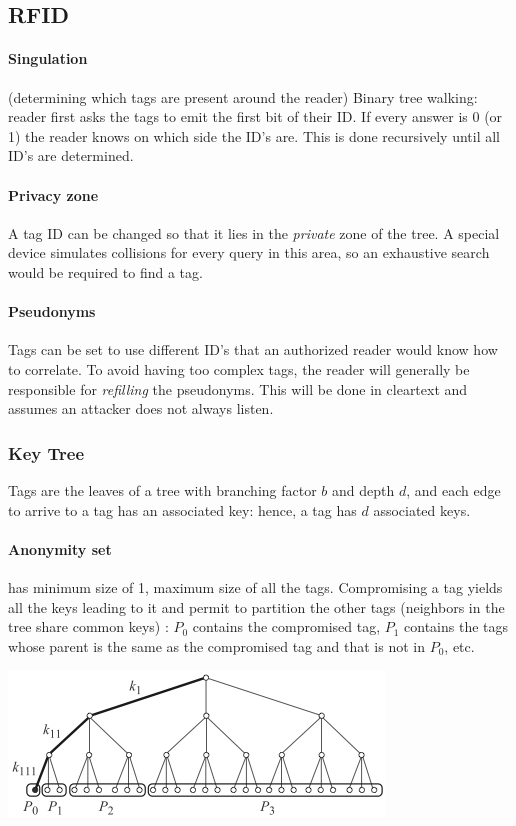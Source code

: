 \documentclass[10pt, a4paper,twocolumn]{scrartcl}
\begin{document}
\subsection{RFID}
\paragraph{Singulation} (determining which tags are present around the reader) Binary tree walking: reader first asks the tags to emit the first bit of their ID. If every answer is 0 (or 1) the reader knows on which side the ID's are. This is done recursively until all ID's are determined.

\paragraph{Privacy zone} A tag ID can be changed so that it lies in the \emph{private} zone of the tree. A special device simulates collisions for every query in this area, so an exhaustive search would be required to find a tag. 

\paragraph{Pseudonyms} Tags can be set to use different ID's that an authorized reader would know how to correlate. To avoid having too complex tags, the reader will generally be responsible for \emph{refilling} the pseudonyms. This will be done in cleartext and assumes an attacker does not always listen.

\subsubsection{Key Tree}
Tags are the leaves of a tree with branching factor $b$ and depth $d$, and each edge to arrive to a tag has an associated key: hence, a tag has $d$ associated keys.

\paragraph{Anonymity set} has minimum size of 1, maximum size of all the tags. Compromising a tag yields all the keys leading to it and permit to partition the other tags (neighbors in the tree share common keys) : $P_0$ contains the compromised tag, $P_1$ contains the tags whose parent is the same as the compromised tag and that is not in $P_0$, etc.
\begin{center}
\includegraphics[width=0.7\columnwidth]{img/anon_set.png}
\end{center}
\end{document}

